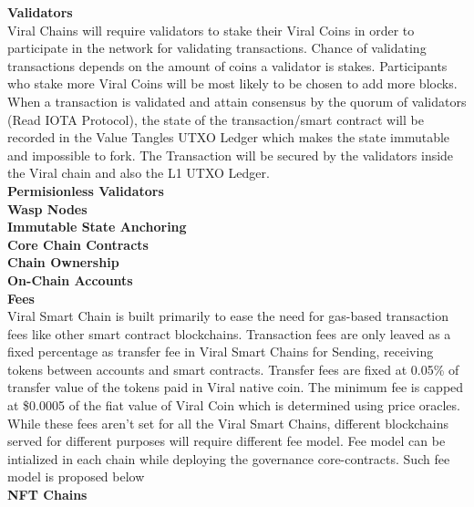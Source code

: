 \documentclass[10pt]{article}
\begin{document}
\textbf{Validators}\\

Viral Chains will require validators to stake their Viral Coins in order to participate in the network for validating transactions. Chance of validating transactions depends on the amount of coins a validator is stakes. Participants who stake more Viral Coins will be most likely to be chosen to add more blocks. When a transaction is validated and attain consensus by the quorum of validators (Read IOTA Protocol), the state of the transaction/smart contract will be recorded in the Value Tangle\textsc{}s UTXO Ledger which makes the state immutable and impossible to fork. The Transaction will be secured by the validators inside the Viral chain and also the L1 UTXO Ledger.\\

\textbf{Permisionless Validators}\\

\textbf{Wasp Nodes}\\

\textbf{Immutable State Anchoring}\\

\textbf{Core Chain Contracts}\\

\textbf{Chain Ownership}\\


\textbf{On-Chain Accounts}\\





\textbf{Fees}\\

Viral Smart Chain is built primarily to ease the need for gas-based transaction fees like other smart contract blockchains. Transaction fees are only leaved as a fixed percentage as transfer fee in Viral Smart Chains for Sending, receiving tokens between accounts and smart contracts. Transfer fees are fixed at 0.05\% of transfer value of the tokens paid in Viral native coin. The minimum fee is capped at \$0.0005 of the fiat value of Viral Coin which is determined using price oracles. While these fees aren't set for all the Viral Smart Chains, different blockchains served for different purposes will require different fee model. Fee model can be intialized in each chain while deploying the governance core-contracts. Such fee model is proposed below\\

\textbf{NFT Chains}\\
\end{document}
